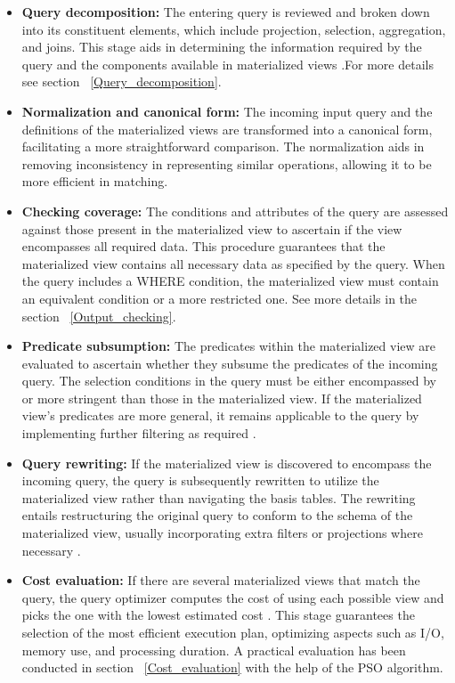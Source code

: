   \begin{itemize}
      \item \textbf{Query decomposition:} The entering query is reviewed and broken down into its constituent elements, which include projection, selection, aggregation, and joins. This stage aids in determining the information required by the query and the components available in materialized views \cite{theodoratos2000decomposition}.For more details see section ~\ref{Query_decomposition}.

      \item \textbf{Normalization and canonical form:} The incoming input query and the definitions of the materialized views are transformed into a canonical form, facilitating a more straightforward comparison. The normalization aids in removing inconsistency in representing similar operations, allowing it to be more efficient in matching.

     \item \textbf{Checking coverage:} The conditions and attributes of the query are assessed against those present in the materialized view to ascertain if the view encompasses all required data. This procedure guarantees that the materialized view contains all necessary data as specified by the query. When the query includes a WHERE condition, the materialized view must contain an equivalent condition or a more restricted one. See more details in the section ~\ref{Output_checking}.
     
      \item \textbf{Predicate subsumption:} The predicates within the materialized view are evaluated to ascertain whether they subsume the predicates of the incoming query. The selection conditions in the query must be either encompassed by or more stringent than those in the materialized view. If the materialized view's predicates are more general, it remains applicable to the query by implementing further filtering as required \cite{adali1996query}.

      \item \textbf{Query rewriting:} If the materialized view is discovered to encompass the incoming query, the query is subsequently rewritten to utilize the materialized view rather than navigating the basis tables. The rewriting entails restructuring the original query to conform to the schema of the materialized view, usually incorporating extra filters or projections where necessary \cite{haldar2001query}.

         \item \textbf{Cost evaluation:} If there are several materialized views that match the query, the query optimizer computes the cost of using each possible view and picks the one with the lowest estimated cost \cite{hulgeri2001cost}. This stage guarantees the selection of the most efficient execution plan, optimizing aspects such as I/O, memory use, and processing duration. A practical evaluation has been conducted in section ~\ref{Cost_evaluation} with the help of the PSO algorithm.

  \end{itemize}
  

